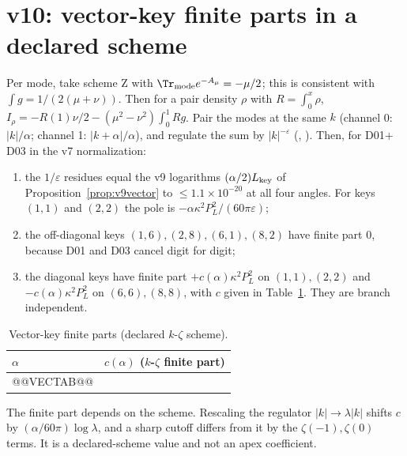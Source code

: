\section{v10: vector-key finite parts in a declared scheme}
\label{sec:v10vector}

\begin{proposition}[Executed]
\label{prop:v10vector}
Per mode, take scheme Z with \(\Tr_{\rm mode}e^{-A_\mu}=-\mu/2\); this
is consistent with \(\int g=1/(2(\mu+\nu))\). Then for a pair density
\(\rho\) with \(R=\int_0^x\rho\),
\(I_\rho=-R(1)\nu/2-(\mu^2-\nu^2)\int_0^1Rg\). Pair the modes at
the same \(k\) (channel 0: \(|k|/\alpha\); channel 1:
\(|k+\alpha|/\alpha\)), and regulate the sum by \(|k|^{-\varepsilon}\)
(, ). Then, for
D01\(+\)D03 in the v7 normalization:
\begin{enumerate}[label=(\alph*)]
\item the \(1/\varepsilon\) residues equal the v9 logarithms
\((\alpha/2)L_{\rm key}\) of Proposition~\ref{prop:v9vector} to
\(\le1.1\times10^{-20}\) at all four angles. For keys \((1,1)\) and
\((2,2)\) the pole is \(-\alpha\kappa^2P_L^2/(60\pi\varepsilon)\);
\item the off-diagonal keys \((1,6),(2,8),(6,1),(8,2)\) have finite
part 0, because D01 and D03 cancel digit for digit;
\item the diagonal keys have finite part
\(+c(\alpha)\kappa^2P_L^2\) on \((1,1),(2,2)\) and
\(-c(\alpha)\kappa^2P_L^2\) on \((6,6),(8,8)\), with \(c\) given in
Table~\ref{tab:v10vec}. They are branch independent.
\end{enumerate}
\end{proposition}
\begin{table}[ht]\centering\small
\caption{Vector-key finite parts (declared \(k\)-\(\zeta\) scheme).}\label{tab:v10vec}
\begin{tabular}{@{}ll@{}}
\toprule
\(\alpha\) & \(c(\alpha)\) (\(k\)-\(\zeta\) finite part)\\
\midrule
@@VECTAB@@
\bottomrule
\end{tabular}
\end{table}
The finite part depends on the scheme. Rescaling the regulator
\(|k|\to\lambda|k|\) shifts \(c\) by
\((\alpha/60\pi)\log\lambda\), and a sharp cutoff differs from it
by the \(\zeta(-1),\zeta(0)\) terms. It is a declared-scheme value
and not an apex coefficient.

